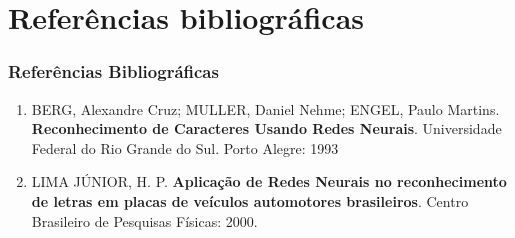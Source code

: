 	\section{Refer\^{e}ncias bibliogr\'{a}ficas}
	\begin{frame}
		\frametitle{Refer\^{e}ncias Bibliogr\'{a}ficas}
		\begin{enumerate}
			\item BERG, Alexandre Cruz; MULLER, Daniel Nehme; ENGEL, Paulo Martins. \textbf{Reconhecimento de Caracteres Usando Redes Neurais}. Universidade Federal do Rio Grande do Sul. Porto Alegre: 1993
			\item LIMA JÚNIOR, H. P. \textbf{Aplicação de Redes Neurais no reconhecimento de letras em placas de veículos automotores brasileiros}. Centro Brasileiro de Pesquisas Físicas: 2000.
		\end{enumerate}
	\end{frame}



